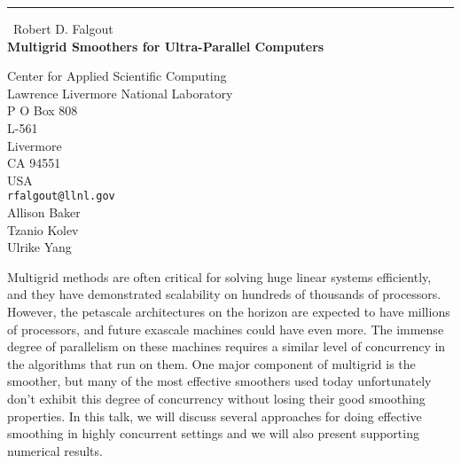 \documentclass{report}
\begin{document}
\begin{center}
\rule{6in}{1pt} \
{\large Robert D. Falgout \\
{\bf Multigrid Smoothers for Ultra-Parallel Computers}}

Center for Applied Scientific Computing \\ Lawrence Livermore National Laboratory \\ P O Box 808 \\ L-561 \\ Livermore \\ CA 94551 \\ USA
\\
{\tt rfalgout@llnl.gov}\\
Allison Baker\\
Tzanio Kolev\\
Ulrike Yang\end{center}

Multigrid methods are often critical for solving huge linear systems
efficiently, and they have demonstrated scalability on hundreds of thousands of
processors. However, the petascale architectures on the horizon are expected to
have millions of processors, and future exascale machines could have even more.
The immense degree of parallelism on these machines requires a similar level of
concurrency in the algorithms that run on them. One major component of
multigrid is the smoother, but many of the most effective smoothers used today
unfortunately don't exhibit this degree of concurrency without losing their good
smoothing properties. In this talk, we will discuss several approaches for
doing effective smoothing in highly concurrent settings and we will also present
supporting numerical results.
\end{document}
